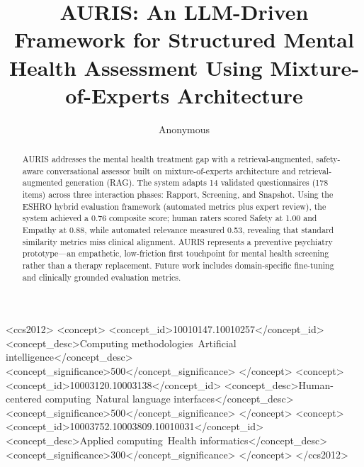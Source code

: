\documentclass[sigconf]{acmart}
\begin{document}
\title{AURIS: An LLM-Driven Framework for Structured Mental Health Assessment Using Mixture-of-Experts Architecture}

\author{Anonymous}

\renewcommand{\shortauthors}{Anonymous et al.}

\begin{abstract}
AURIS addresses the mental health treatment gap with a retrieval-augmented, safety-aware conversational assessor built on mixture-of-experts architecture and retrieval-augmented generation (RAG). The system adapts 14 validated questionnaires (178 items) across three interaction phases: Rapport, Screening, and Snapshot. Using the ESHRO hybrid evaluation framework (automated metrics plus expert review), the system achieved a 0.76 composite score; human raters scored Safety at 1.00 and Empathy at 0.88, while automated relevance measured 0.53, revealing that standard similarity metrics miss clinical alignment. AURIS represents a preventive psychiatry prototype—an empathetic, low-friction first touchpoint for mental health screening rather than a therapy replacement. Future work includes domain-specific fine-tuning and clinically grounded evaluation metrics.
\end{abstract}

\begin{CCSXML}
<ccs2012>
<concept>
<concept_id>10010147.10010257</concept_id>
<concept_desc>Computing methodologies~Artificial intelligence</concept_desc>
<concept_significance>500</concept_significance>
</concept>
<concept>
<concept_id>10003120.10003138</concept_id>
<concept_desc>Human-centered computing~Natural language interfaces</concept_desc>
<concept_significance>500</concept_significance>
</concept>
<concept>
<concept_id>10003752.10003809.10010031</concept_id>
<concept_desc>Applied computing~Health informatics</concept_desc>
<concept_significance>300</concept_significance>
</concept>
</ccs2012>
\end{CCSXML}



\maketitle
\end{document}
